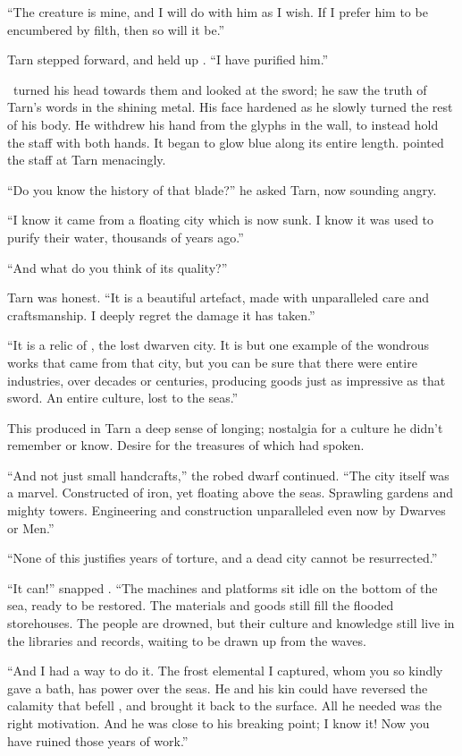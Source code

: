 ``The creature is mine, and I will do with him as I wish.  If I prefer him to be encumbered by filth, then so will it be.''

Tarn stepped forward, and held up \kildir.  ``I have purified him.''

\mothzam\ turned his head towards them and looked at the sword; he saw the truth of Tarn's words in the shining metal.  His face hardened as he slowly turned the rest of his body.  He withdrew his hand from the glyphs in the wall, to instead hold the staff with both hands.  It began to glow blue along its entire length.  \mothzam pointed the staff at Tarn menacingly.

``Do you know the history of that blade?'' he asked Tarn, now sounding angry.

``I know it came from a floating city which is now sunk.  I know it was used to purify their water, thousands of years ago.''

``And what do you think of its quality?''

Tarn was honest.  ``It is a beautiful artefact, made with unparalleled care and craftsmanship.  I deeply regret the damage it has taken.''

``It is a relic of \valdunmir, the lost dwarven city.  It is but one example of the wondrous works that came from that city, but you can be sure that there were entire industries, over decades or centuries, producing goods just as impressive as that sword.  An entire culture, lost to the seas.''

This produced in Tarn a deep sense of longing; nostalgia for a culture he didn't remember or know.  Desire for the treasures of which \mothzam had spoken.

``And not just small handcrafts,'' the robed dwarf continued. ``The city itself was a marvel.  Constructed of iron, yet floating above the seas.  Sprawling gardens and mighty towers.  Engineering and construction unparalleled even now by Dwarves or Men.''

``None of this justifies years of torture, and a dead city cannot be resurrected.''

``It can!'' snapped \mothzam.  ``The machines and platforms sit idle on the bottom of the sea, ready to be restored.  The materials and goods still fill the flooded storehouses.  The people are drowned, but their culture and knowledge still live in the libraries and records, waiting to be drawn up from the waves.

``And I had a way to do it.  The frost elemental I captured, whom you so kindly gave a bath, has power over the seas.  He and his kin could have reversed the calamity that befell \valdunmir, and brought it back to the surface.  All he needed was the right motivation.  And he was close to his breaking point; I know it!  Now you have ruined those years of work.''

